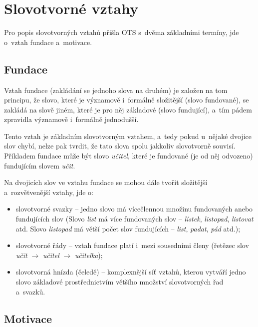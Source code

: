 \hypertarget{slovotvornuxe9-vztahy}{%
\section{Slovotvorné vztahy}\label{slovotvornuxe9-vztahy}}

Pro popis slovotvorných vztahů přišla OTS s~dvěma základními termíny,
jde o~vztah fundace a~motivace.

\hypertarget{fundace}{%
\subsection{Fundace}\label{fundace}}

Vztah fundace (zakládání se jednoho slova na druhém) je založen na tom
principu, že slovo, které je významově i~formálně složitější (slovo
fundované), se zakládá na slově jiném, které je pro něj základové (slovo
fundující), a~tím pádem zpravidla významově i~formálně jednodušší.
\parencite[95]{dokulil00}

Tento vztah je základním slovotvorným vztahem, a~tedy pokud u~nějaké
dvojice slov chybí, nelze pak tvrdit, že tato slova spolu jakkoliv
slovotvorně souvisí. Příkladem fundace může být slovo \emph{učitel},
které je fundované (je od něj odvozeno) fundujícím slovem \emph{učit}.

Na dvojicích slov ve vztahu fundace se mohou dále tvořit složitější
a~rozvětvenější vztahy, jde o:

\begin{itemize}
\tightlist
\item
  slovotvorné svazky -- jedno slovo má vícečlennou množinu fundovaných
  anebo fundujících slov (Slovo \emph{list} má více fundovaných slov --
  \emph{lístek}, \emph{listopad}, \emph{listovat} atd. Slovo
  \emph{listopad} má větší počet slov fundujících -- \emph{list},
  \emph{padat}, \emph{pád} atd.);
\item
  slovotvorné řády -- vztah fundace platí i~mezi sousedními členy
  (řetězec slov \emph{učit} $\rightarrow$ \emph{učitel}
  $\rightarrow$ \emph{učitelka});
\item
  slovotvorná hnízda (čeledě) -- komplexnější síť vztahů, kterou vytváří
  jedno slovo základové prostřednictvím většího množství slovotvorných
  řad a~svazků.~\parencite[12--13]{dokulil62}
\end{itemize}

\hypertarget{motivace}{%
\subsection{Motivace}\label{motivace}}

